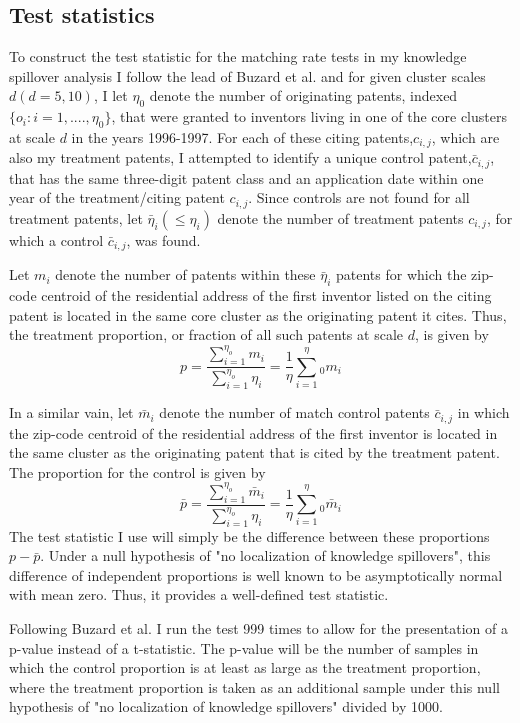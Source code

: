 \documentclass[12pt,letterpaper]{article}
\begin{document}
\subsection{Test statistics}
To construct the test statistic for the matching rate tests in my knowledge spillover analysis I follow the lead of Buzard et al. and for given cluster scales \(d(d=5,10)\), I let \(\eta_0\) denote the number of originating patents, indexed \(\{o_i:i=1,....,\eta_0\}\), that were granted to inventors living in one of the core clusters at scale \(d\) in the years 1996-1997. For each of these citing patents,\(c_{i,j}\), which are also my treatment patents, I attempted to identify a unique control patent,\(\bar{c}_{i,j}\), that has the same three-digit patent class and an application date within one year of the treatment/citing patent \(c_{i,j}\). Since controls are not found for all treatment patents, let \(\bar{\eta}_i(\leq\eta_i)\) denote the number of treatment patents \(c_{i,j}\), for which a control \(\bar{c}_{i,j}\), was found.
\par 
Let \(m_i\) denote the number of patents within these \(\bar{\eta}_i\) patents for which the zip-code centroid of the residential address of the first inventor listed on the citing patent is located in the same core cluster as the originating patent it cites. Thus, the treatment proportion, or fraction of all such patents at scale \(d\), is given by
\begin{equation}
    p = \frac{\sum_{i=1}^{\eta_o}m_i}{\sum_{i=1}^{\eta_o}\eta_i} = \frac{1}{\eta}\sum_{i=1}^\eta_0m_i
\end{equation}
\par 
In a similar vain, let \(\bar{m}_i\) denote the number of match control patents \(\bar{c}_{i,j}\) in which the zip-code centroid of the residential address of the first inventor is located in the same cluster as the originating patent that is cited by the treatment patent. The proportion for the control is given by
\begin{equation}
    \bar{p} = \frac{\sum_{i=1}^{\eta_o}\bar{m}_i}{\sum_{i=1}^{\eta_o}\eta_i} = \frac{1}{\eta}\sum_{i=1}^\eta_0\bar{m}_i
\end{equation}
The test statistic I use will simply be the difference between these proportions \(p-\bar{p}\). Under a null hypothesis of "no localization of knowledge spillovers", this difference of independent proportions is well known to be asymptotically normal with mean zero. Thus, it provides a well-defined test statistic. 
\par 
Following Buzard et al. I run the test 999 times to allow for the presentation of a p-value instead of a t-statistic. The p-value will be the number of samples in which the control proportion is at least as large as the treatment proportion, where the treatment proportion is taken as an additional sample under this null hypothesis of "no localization of knowledge spillovers" divided by 1000. 
\end{document}
